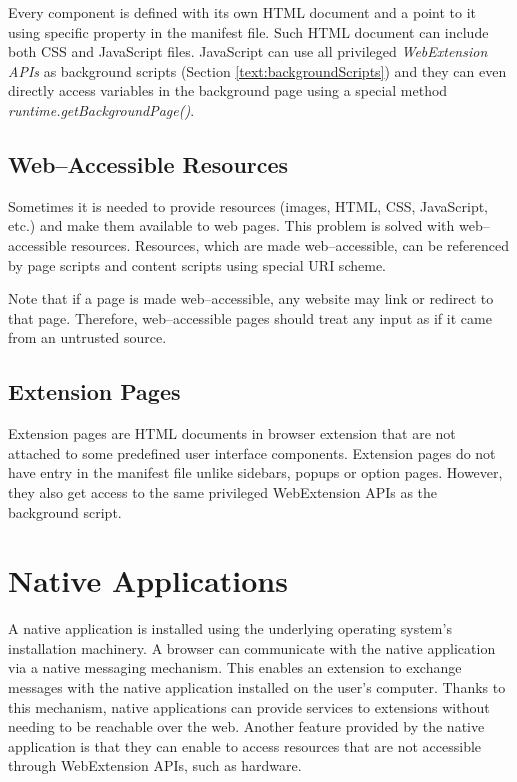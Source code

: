 Every component is defined with its own HTML document and a point to it using specific property in the manifest file. Such HTML document can include both CSS and JavaScript files. JavaScript can use all privileged\textit{ WebExtension APIs} as background scripts (Section \ref{text:backgroundScripts}) and they can even directly access variables in the background page using a special method \textit{runtime.getBackgroundPage()}.

\subsection{Web--Accessible Resources}
Sometimes it is needed to provide resources (images, HTML, CSS, JavaScript, etc.) and make them available to web pages. This problem is solved with web--accessible resources. Resources, which are made web--accessible, can be referenced by page scripts and content scripts using special URI scheme.

Note that if a page is made web--accessible, any website may link or redirect to that page. Therefore, web--accessible pages should treat any input as if it came from an untrusted source.

\subsection{Extension Pages}
Extension pages are HTML documents in browser extension that are not attached to some predefined user interface components. Extension pages do not have entry in the manifest file unlike sidebars, popups or option pages. However, they also get access to the same privileged WebExtension APIs as the background script.

\section{Native Applications}
A native application is installed using the underlying operating system's installation machinery. A browser can communicate with the native application via a native messaging mechanism. This enables an extension to exchange messages with the native application installed on the user's computer. Thanks to this mechanism, native applications can provide services to extensions without needing to be reachable over the web. Another feature provided by the native application is that they can enable to access resources that are not accessible through WebExtension APIs, such as hardware.

